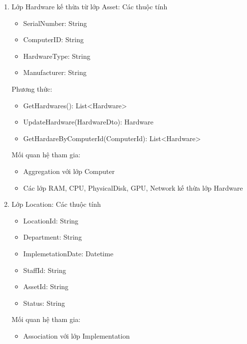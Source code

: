 \begin{enumerate}
    Các phương thức:
    \begin{itemize}[label=--]
        \item getComputer(): Computer
        \item getSoftware(): Software
        \item isLegal(software: Software): Boolean
    \end{itemize}
    Tham gia mối quan hệ Aggregation với  lớp Computer, Software
    \item Lớp Hardware kế thừa từ lớp Asset:
    Các thuộc tính
    \begin{itemize}[label=--]
        \item SerialNumber: String
        \item ComputerID: String
        \item HardwareType: String
        \item Manufacturer: String
    \end{itemize}
    Phương thức:
    \begin{itemize}[label=--]
        \item GetHardwares(): List<Hardware>
        \item UpdateHardware(HardwareDto): Hardware
        \item GetHardareByComputerId(ComputerId): List<Hardware>
    \end{itemize}
    Mối quan hệ tham gia:
    \begin{itemize}[label=--]
        \item Aggregation với lớp Computer
        \item Các lớp RAM, CPU, PhysicalDisk, GPU, Network kế thừa lớp Hardware
    \end{itemize}
    \item Lớp Location:
    Các thuộc tính
    \begin{itemize}[label=--]
        \item LocationId: String
        \item Department: String
        \item  ImplemetationDate: Datetime
        \item  StaffId: String
        \item  AssetId: String
        \item  Status: String
    \end{itemize}
    Mối quan hệ tham gia:
    \begin{itemize}[label=--]
        \item Association với lớp Implementation

\end{itemize}
\end{enumerate}
